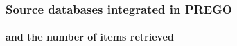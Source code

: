 \documentclass{beamer}
\begin{document}
   \begin{frame}
      \frametitle{Source databases integrated in PREGO }
      \framesubtitle{and the number of items retrieved}


\end{frame}
\end{document}
